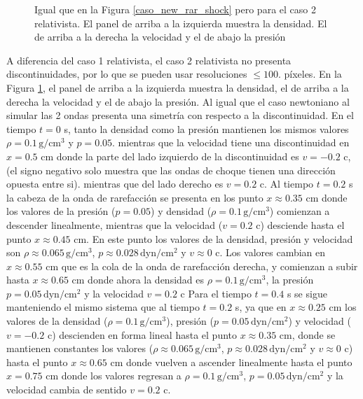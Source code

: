 \documentclass[12pt,a4paper]{book}
\begin{document}
\begin{figure}
    \caption{Igual que en la Figura \ref{caso_new_rar_shock} pero para el caso 2 relativista. 
    El panel de arriba a la izquierda muestra la densidad.
    El de arriba a la derecha la velocidad y el de abajo la presión}\label{caso_rel_shock_shock}
\end{figure}
A diferencia del caso 1 relativista, el caso 2 relativista no presenta discontinuidades,
por lo que se pueden usar resoluciones $\leq 100.$ píxeles. En la Figura 
\ref{caso_rel_shock_shock},  
el panel de arriba a la izquierda muestra la densidad, el de arriba a la derecha la velocidad
y el de abajo la presión.
Al igual que el caso newtoniano al simular las 2 ondas presenta una simetría con respecto a la 
discontinuidad.
En el tiempo $t = 0$ s, tanto la densidad como la presión mantienen los mismos valores 
$\rho =0.1 \,  \text{g}/ \text{cm}^3$
y $p = 0.05$. mientras que la velocidad tiene una discontinuidad en $x = 0.5$ cm donde la parte del lado
izquierdo de la discontinuidad es $v = -0.2$ c,  (el signo negativo solo muestra que las ondas de choque
tienen una dirección opuesta entre si). 
mientras que del lado derecho es $v = 0.2$ c.
Al tiempo $t = 0.2$ s la cabeza de la onda de rarefacción se presenta en los punto 
$x \approx 0.35$ cm donde los valores de la presión ($p = 0.05$) y densidad 
($\rho =0.1 \,  \text{g}/ \text{cm}^3$) comienzan a descender linealmente,
mientras que la velocidad ($v = 0.2$ c) desciende hasta el punto $x \approx 0.45$ cm. En este punto los valores de la densidad, presión y velocidad
son $\rho \approx 0.065 \,  \text{g}/ \text{cm}^3$, $p \approx 0.028\,  \text{dyn}/ \text{cm}^2 $ 
y $v \approx 0$ c. Los valores cambian en 
$ x \approx 0.55$ cm
que es la cola de la onda de rarefacción derecha, y comienzan a subir
hasta $x \approx 0.65$ cm donde ahora la densidad es 
$\rho = 0.1 \,  \text{g}/ \text{cm}^3$, la presión $p = 0.05 \,  \text{dyn}/ \text{cm}^2 $ y 
la velocidad $v = 0.2$ c
Para el tiempo $t = 0.4$ s se sigue manteniendo el mismo sistema que al tiempo $t =0.2$ s, ya que en
$x \approx 0.25$ cm los valores de la densidad ($\rho = 0.1 \,  \text{g}/ \text{cm}^3$), 
presión ($p = 0.05 \,  \text{dyn}/ \text{cm}^2 $) 
y velocidad ($v = -0.2$ c) descienden en forma lineal hasta el punto $x \approx 0.35$ cm, donde 
se mantienen constantes los valores ($\rho \approx 0.065  \,  \text{g}/ \text{cm}^3$, 
$p \approx 0.028\,  \text{dyn}/ \text{cm}^2 $ y $v \approx 0$ c) 
hasta el punto $x \approx 0.65$ cm donde vuelven a ascender linealmente
hasta el punto $x = 0.75$ cm donde los valores regresan a $\rho = 0.1 \,  \text{g}/ \text{cm}^3$, 
$p = 0.05 \,  \text{dyn}/ \text{cm}^2 $ y la velocidad 
cambia de sentido $v = 0.2$ c.
\end{document}

